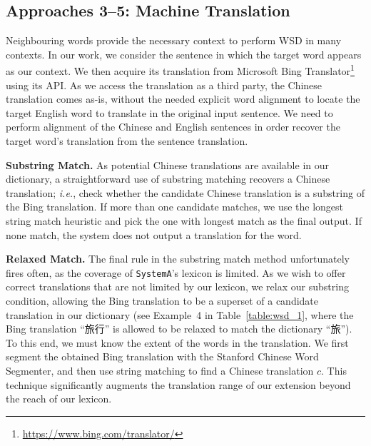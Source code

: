 \begin{CJK}{UTF8}{gbsn}
\subsection{Approaches 3--5: Machine Translation}

Neighbouring words provide the necessary context to perform WSD in
many contexts. In our work, we consider the sentence in which the
target word appears as our context. We then acquire its translation
from Microsoft Bing
Translator\footnote{\url{https://www.bing.com/translator/}} using its
API.  As we access the translation as a third party, the Chinese
translation comes as-is, without the needed explicit word alignment to
locate the target English word to translate in the original input
sentence. We need to perform alignment of the Chinese and English
sentences in order recover the target word's translation from the
sentence translation.

{\bf Substring Match.} As potential Chinese translations are
available in our dictionary, a straightforward use of substring
matching recovers a Chinese translation; {\it i.e.}, check whether the
candidate Chinese translation is a substring of the Bing
translation. If more than one candidate matches, we use the longest
string match heuristic and pick the one with longest match as the
final output. If none match, the system does not output a translation
for the word.  


{\bf Relaxed Match.} The final rule in the substring match method
unfortunately fires often, as the coverage of {\tt SystemA}'s lexicon
is limited.  As we wish to offer correct translations that are not
limited by our lexicon, we relax our substring condition, allowing the
Bing translation to be a superset of a candidate translation in our
dictionary (see Example~4 in Table~\ref{table:wsd_1}, where the Bing
translation ``旅行'' is allowed to be relaxed to match the dictionary
``旅'').
To this end, we must know the extent of the words in the translation.
We first segment the obtained Bing translation with the Stanford
Chinese Word Segmenter, and then use string matching to find a Chinese
translation $c$.  This technique significantly augments the
translation range of our extension beyond the reach of our lexicon.




\end{CJK}

